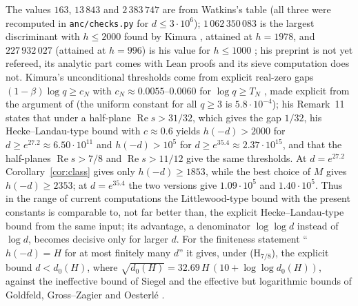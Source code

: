 \documentclass[11pt]{article}
\theoremstyle{definition}
\theoremstyle{remark}
\numberwithin{equation}{section}
\newcommand{\Rea}{\operatorname{Re}}
\begin{document}
The values $163$, $13\,843$ and $2\,383\,747$ are from Watkins's table \cite{watkins2004} (all three were recomputed in \texttt{anc/checks.py} for $d\le3\cdot10^6$); $1\,062\,350\,083$ is the largest discriminant with $h\le2000$ found by Kimura \cite[Theorem~2]{kimura2026}, attained at $h=1978$, and $227\,932\,027$ (attained at $h=996$) is his value for $h\le1000$ \cite[p.~3]{kimura2026}; his preprint is not yet refereed, its analytic part comes with Lean proofs and its sieve computation does not. Kimura's unconditional thresholds come from explicit real-zero gaps $(1-\beta)\log q\ge c_N$ with $c_N\approx0.0055$--$0.0060$ for $\log q\ge T_N$ \cite[Table~1]{kimura2026}, made explicit from the argument of \cite{openai2026ls} (the uniform constant for all $q\ge3$ is $5.8\cdot10^{-4}$); his Remark~11 states that under a half-plane $\Rea s>31/32$, which gives the gap $1/32$, his Hecke--Landau-type bound with $c\approx0.6$ yields $h(-d)>2000$ for $d\ge e^{27.2}\approx6.50\cdot10^{11}$ and $h(-d)>10^5$ for $d\ge e^{35.4}\approx2.37\cdot10^{15}$, and that the half-planes $\Rea s>7/8$ and $\Rea s>11/12$ give the same thresholds. At $d=e^{27.2}$ Corollary~\ref{cor:class} gives only $h(-d)\ge1853$, while the best choice of $M$ gives $h(-d)\ge2353$; at $d=e^{35.4}$ the two versions give $1.09\cdot10^5$ and $1.40\cdot10^5$. Thus in the range of current computations the Littlewood-type bound with the present constants is comparable to, not far better than, the explicit Hecke--Landau-type bound from the same input; its advantage, a denominator $\log\log d$ instead of $\log d$, becomes decisive only for larger $d$. For the finiteness statement ``$h(-d)=H$ for at most finitely many $d$'' it gives, under (H$_{7/8}$), the explicit bound $d<d_0(H)$, where $\sqrt{d_0(H)}=32.69\,H\,(10+\log\log d_0(H))$, against the ineffective bound of Siegel \cite{siegel1935} and the effective but logarithmic bounds of Goldfeld, Gross--Zagier and Oesterl\'e \cite{goldfeld1976,grosszagier1986,oesterle1985}.
\end{document}
